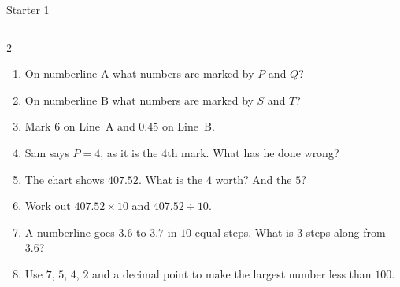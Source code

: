 \documentclass{beamer}
\newcommand{\ashow}[1]{\uncover<2->{\textcolor{red}{\small #1}}}
\newcommand{\qtight}{%
  \setlength{\itemsep}{0pt}\setlength{\parskip}{0pt}\setlength{\parsep}{0pt}%
  \setlength{\topsep}{0pt}\setlength{\partopsep}{0pt}%
}
\begin{document}
\begin{frame}{Starter 1}
\begin{columns}[T]

\small
\begin{multicols}{2}
\begin{enumerate}\qtight

  \item On numberline A what numbers are marked by  $P$ and $Q$? \ashow{$3$ and $8$}

  \item On numberline B what numbers are marked by  $S$ and $T$? \ashow{$0.3$ and $0.9$}

  \item Mark $6$ on Line~A and $0.45$ on Line~B.

  \item Sam says $P=4$, as it is the $4$th mark. What has he done wrong? \ashow{Counted marks, not steps: $P=3$}
  \columnbreak

  \item The chart shows $407.52$. What is the $4$ worth? And the $5$? \ashow{$400$ and $0.5$}


  \item Work out $407.52\times 10$ and $407.52\div 10$. \ashow{$4075.2$ and $40.752$}

  \item A numberline goes $3.6$ to $3.7$ in $10$ equal steps. What is $3$ steps along from $3.6$? \ashow{$3.63$}

  \item Use $7$, $5$, $4$, $2$ and a decimal point to make the largest number less than $100$. \ashow{$75.42$}

\end{enumerate}
\end{multicols}

\end{columns}

\end{frame}
\end{document}
